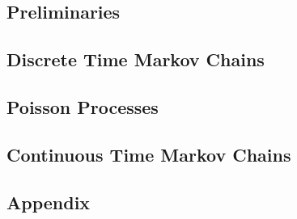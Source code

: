\documentclass{article}
\begin{document}
  \begin{multicols}{2}
    \noindent\subsection*{Preliminaries}
    
    
    
    \subsection*{Discrete Time Markov Chains}
    
    
    
    
    
    
    
    
    
    
    
    \subsection*{Poisson Processes}
    
    
    
    
    
    
    \subsection*{Continuous Time Markov Chains}
    
    
    
    
    
    
    
    \subsection*{Appendix}
    
    
    
  \end{multicols}
\end{document}
